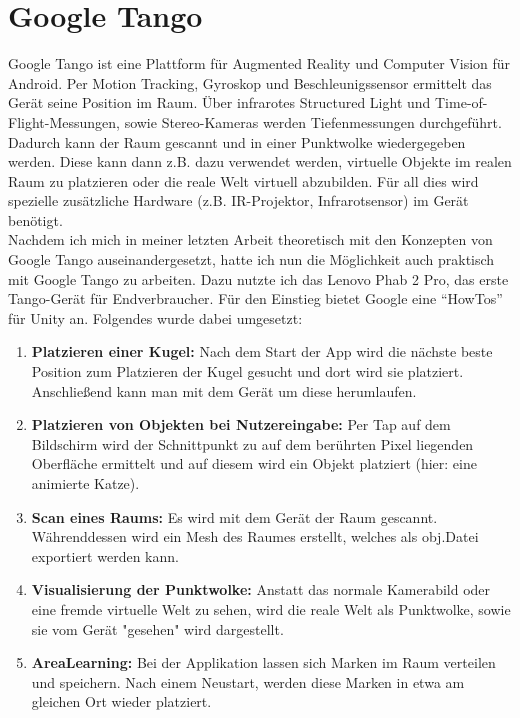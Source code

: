 
\section{Google Tango}
Google Tango ist eine Plattform für Augmented Reality und Computer Vision für Android. Per Motion Tracking, Gyroskop und Beschleunigssensor ermittelt das Gerät seine Position im Raum. Über infrarotes Structured Light und Time-of-Flight-Messungen, sowie Stereo-Kameras werden Tiefenmessungen durchgeführt. Dadurch kann der Raum gescannt und in einer Punktwolke wiedergegeben werden. Diese kann dann z.B. dazu verwendet werden, virtuelle Objekte im realen Raum zu platzieren oder die reale Welt virtuell abzubilden. Für all dies wird spezielle zusätzliche Hardware (z.B. IR-Projektor, Infrarotsensor) im Gerät benötigt.\cite{fehling}\\
Nachdem ich mich in meiner letzten Arbeit theoretisch mit den Konzepten von Google Tango auseinandergesetzt, hatte ich nun die Möglichkeit auch praktisch mit Google Tango zu arbeiten. Dazu nutzte ich das Lenovo Phab 2 Pro, das erste Tango-Gerät für Endverbraucher. Für den Einstieg bietet Google eine "`HowTos"' für Unity an. Folgendes wurde dabei umgesetzt:
\begin{enumerate}
	\item\textbf{Platzieren einer Kugel:} Nach dem Start der App wird die nächste beste Position zum Platzieren der Kugel gesucht und dort wird sie platziert. Anschließend kann man mit dem Gerät um diese herumlaufen.
	\item\textbf{Platzieren von Objekten bei Nutzereingabe:} Per Tap auf dem Bildschirm wird der Schnittpunkt zu auf dem berührten Pixel liegenden Oberfläche ermittelt und auf diesem wird ein Objekt platziert (hier: eine animierte Katze).
	\item\textbf{Scan eines Raums:} Es wird mit dem Gerät der Raum gescannt. Währenddessen wird ein Mesh des Raumes erstellt, welches als obj.Datei exportiert werden kann.
	\item\textbf{Visualisierung der Punktwolke:} Anstatt das normale Kamerabild oder eine fremde virtuelle Welt zu sehen, wird die reale Welt als Punktwolke, sowie sie vom Gerät "gesehen" wird dargestellt.
	\item\textbf{AreaLearning:} Bei der Applikation lassen sich Marken im Raum verteilen und speichern. Nach einem Neustart, werden diese Marken in etwa am gleichen Ort wieder platziert.
\end{enumerate}
